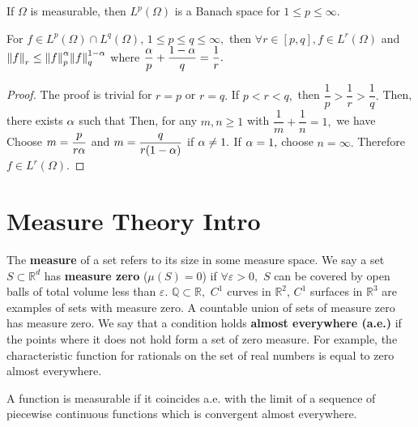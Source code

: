 \begin{theorem}
    If $\Omega$ is measurable, then $L^p(\Omega)$ is a Banach space for $1\leq p\leq\infty.$
\end{theorem}
\begin{theorem}
    For $f\in L^p(\Omega)\cap L^q(\Omega),\,1\leq p\leq q\leq \infty,$ then $\forall r\in[p,q],f\in L^r(\Omega)$ and $\norm{f}_r\leq\norm{f}_p^\alpha\norm{f}_q^{1-\alpha}$ where $\dfrac{\alpha}{p}+\dfrac{1-\alpha}{q}=\dfrac{1}{r}.$
\end{theorem}
\begin{proof}
    The proof is trivial for $r=p$ or $r=q.$ If $p<r<q,$ then $\dfrac{1}{p}>\dfrac{1}{r}>\dfrac{1}{q}.$ Then, there exists $\alpha$ such that
    Then, for any $m,n\geq1$ with $\dfrac{1}{m}+\dfrac{1}{n}=1,$ we have
    Choose $m=\dfrac{p}{r\alpha}$ and $m=\dfrac{q}{r(1-\alpha)}$ if $\alpha\neq1.$ If $\alpha=1,$ choose $n=\infty.$
    Therefore $f\in L^r(\Omega).$
\end{proof}

\section{Measure Theory Intro}
The \textbf{measure} of a set refers to its size in some measure space. We say a set $S\subset\mathbb{R}^d$ has \textbf{measure zero} ($\mu(S)=0$) if $\forall\varepsilon>0,$ $S$ can be covered by open balls of total volume less than $\varepsilon.$ $\mathbb{Q}\subset\mathbb{R},$ $C^1$ curves in $\mathbb{R}^2$, $C^1$ surfaces in $\mathbb{R}^3$ are examples of sets with measure zero. A countable union of sets of measure zero has measure zero. We say that a condition holds \textbf{almost everywhere (a.e.)} if the points where it does not hold form a set of zero measure. For example, the characteristic function for rationals on the set of real numbers is equal to zero almost everywhere.

\begin{definition}
    A function is measurable if it coincides a.e. with the limit of a sequence of piecewise continuous functions which is convergent almost everywhere.
\end{definition}

